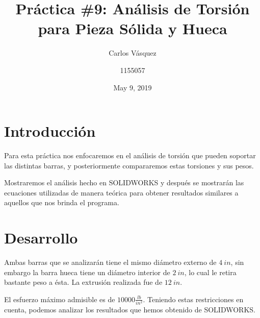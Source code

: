 \documentclass[12pt, letterpaper]{article}
\title{Práctica \#9: Análisis de Torsión para Pieza Sólida y Hueca}
\author{Carlos Vásquez \and 1155057}
\date{May 9, 2019}
\begin{document}
\maketitle
\section*{Introducción}
Para esta práctica nos enfocaremos en el análisis de torsión que pueden soportar las distintas barras, y posteriormente compararemos estas torsiones y sus pesos.

Mostraremos el análisis hecho en SOLIDWORKS y después se mostrarán las ecuaciones utilizadas de manera teórica para obtener resultados similares a aquellos que nos brinda el programa.

\section*{Desarrollo}
Ambas barras que se analizarán tiene el mismo diámetro externo de $4\ in$, sin embargo la barra hueca tiene un diámetro interior de $2\ in$, lo cual le retira bastante peso a ésta. La extrusión realizada fue de $12\ in$.

El esfuerzo máximo admisible es de $10000 \frac{lb}{in^2}$. Teniendo estas restricciones en cuenta, podemos analizar los resultados que hemos obtenido de SOLIDWORKS.
\end{document}
